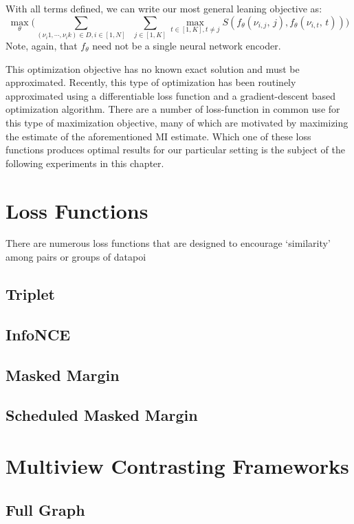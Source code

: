With all terms defined, we can write our most general leaning objective as:
\begin{equation}
    \underset{\theta}{\max} \Big(\sum_{(\nu_i1,\cdots, \nu_ik)\in D, i\in[1,N]} \;\; \sum_{j\in[1,K]} \underset{t\in[1,K], t\neq j }{\max} S(f_\theta(\nu_{i,j}, \,j), f_\theta(\nu_{i,t}, \,t))\Big)
\end{equation}
Note, again, that $f_\theta$ need not be a single neural network encoder.

This optimization objective has no known exact solution  and must be approximated.
Recently, this type of optimization has been routinely  approximated using a differentiable loss function and a gradient-descent based optimization algorithm.
There are a number of loss-function in common use for this type of maximization objective, many of which are motivated by maximizing the estimate of the aforementioned MI estimate.
Which one of these loss functions produces optimal results for our particular setting is the subject of the following experiments in this chapter.

\section{Loss Functions}
There are numerous loss functions that are designed to encourage `similarity' among pairs or groups of datapoi
\subsection{Triplet}
\subsection{InfoNCE}
\subsection{Masked Margin}
\subsection{Scheduled Masked Margin}
\section{Multiview Contrasting Frameworks}
\label{section:backg_contrast_framework}
\subsection{Full Graph}
\label{section:full_graph_framework}
